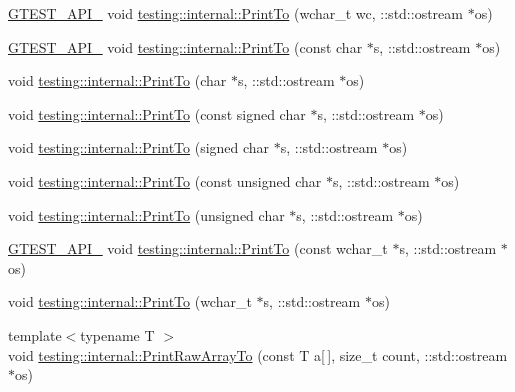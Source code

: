 \begin{DoxyCompactItemize}
\item 
\mbox{\hyperlink{gtest-port_8h_aa73be6f0ba4a7456180a94904ce17790}{G\+T\+E\+S\+T\+\_\+\+A\+P\+I\+\_\+}} void \mbox{\hyperlink{namespacetesting_1_1internal_a6c50fd437a2ae2ff6f182ccd6c2744dd}{testing\+::internal\+::\+Print\+To}} (wchar\+\_\+t wc, \+::std\+::ostream $\ast$os)
\item 
\mbox{\hyperlink{gtest-port_8h_aa73be6f0ba4a7456180a94904ce17790}{G\+T\+E\+S\+T\+\_\+\+A\+P\+I\+\_\+}} void \mbox{\hyperlink{namespacetesting_1_1internal_ac226053b96d7d61f9407e3b75bab07d9}{testing\+::internal\+::\+Print\+To}} (const char $\ast$s, \+::std\+::ostream $\ast$os)
\item 
void \mbox{\hyperlink{namespacetesting_1_1internal_a553eec7bb50de01c9e91cac4accc606f}{testing\+::internal\+::\+Print\+To}} (char $\ast$s, \+::std\+::ostream $\ast$os)
\item 
void \mbox{\hyperlink{namespacetesting_1_1internal_a792cc5665a34619ed7a6d54711433456}{testing\+::internal\+::\+Print\+To}} (const signed char $\ast$s, \+::std\+::ostream $\ast$os)
\item 
void \mbox{\hyperlink{namespacetesting_1_1internal_a1320096b116f8cc4b688acbd5b783051}{testing\+::internal\+::\+Print\+To}} (signed char $\ast$s, \+::std\+::ostream $\ast$os)
\item 
void \mbox{\hyperlink{namespacetesting_1_1internal_a42c591f2164ad105b502a9262333aed2}{testing\+::internal\+::\+Print\+To}} (const unsigned char $\ast$s, \+::std\+::ostream $\ast$os)
\item 
void \mbox{\hyperlink{namespacetesting_1_1internal_a7fae797c500d66d0f5a9db4f205e3416}{testing\+::internal\+::\+Print\+To}} (unsigned char $\ast$s, \+::std\+::ostream $\ast$os)
\item 
\mbox{\hyperlink{gtest-port_8h_aa73be6f0ba4a7456180a94904ce17790}{G\+T\+E\+S\+T\+\_\+\+A\+P\+I\+\_\+}} void \mbox{\hyperlink{namespacetesting_1_1internal_afb038075e9e2166d1d9158a19e0eed23}{testing\+::internal\+::\+Print\+To}} (const wchar\+\_\+t $\ast$s, \+::std\+::ostream $\ast$os)
\item 
void \mbox{\hyperlink{namespacetesting_1_1internal_a8d41baa371fad3eb5a3dbe1bbc02c290}{testing\+::internal\+::\+Print\+To}} (wchar\+\_\+t $\ast$s, \+::std\+::ostream $\ast$os)
\item 
{\footnotesize template$<$typename T $>$ }\\void \mbox{\hyperlink{namespacetesting_1_1internal_ad3013b6b4c825edee9fe18ff1d982faa}{testing\+::internal\+::\+Print\+Raw\+Array\+To}} (const T a\mbox{[}$\,$\mbox{]}, size\+\_\+t count, \+::std\+::ostream $\ast$os)

\end{DoxyCompactItemize}
